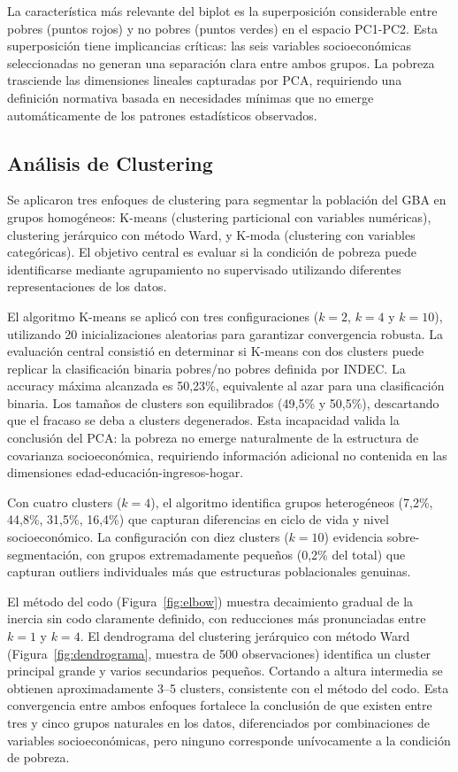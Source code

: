 \documentclass[11pt,a4paper]{article}
\begin{document}
La característica más relevante del biplot es la superposición considerable entre pobres (puntos rojos) y no pobres (puntos verdes) en el espacio PC1-PC2. Esta superposición tiene implicancias críticas: las seis variables socioeconómicas seleccionadas no generan una separación clara entre ambos grupos. La pobreza trasciende las dimensiones lineales capturadas por PCA, requiriendo una definición normativa basada en necesidades mínimas que no emerge automáticamente de los patrones estadísticos observados.

\subsection{Análisis de Clustering}

Se aplicaron tres enfoques de clustering para segmentar la población del GBA en grupos homogéneos: K-means (clustering particional con variables numéricas), clustering jerárquico con método Ward, y K-moda (clustering con variables categóricas). El objetivo central es evaluar si la condición de pobreza puede identificarse mediante agrupamiento no supervisado utilizando diferentes representaciones de los datos.

El algoritmo K-means se aplicó con tres configuraciones ($k=2$, $k=4$ y $k=10$), utilizando 20 inicializaciones aleatorias para garantizar convergencia robusta. La evaluación central consistió en determinar si K-means con dos clusters puede replicar la clasificación binaria pobres/no pobres definida por INDEC\@. La accuracy máxima alcanzada es 50,23\%, equivalente al azar para una clasificación binaria. Los tamaños de clusters son equilibrados (49,5\% y 50,5\%), descartando que el fracaso se deba a clusters degenerados. Esta incapacidad valida la conclusión del PCA: la pobreza no emerge naturalmente de la estructura de covarianza socioeconómica, requiriendo información adicional no contenida en las dimensiones edad-educación-ingresos-hogar.

Con cuatro clusters ($k=4$), el algoritmo identifica grupos heterogéneos (7,2\%, 44,8\%, 31,5\%, 16,4\%) que capturan diferencias en ciclo de vida y nivel socioeconómico. La configuración con diez clusters ($k=10$) evidencia sobre-segmentación, con grupos extremadamente pequeños (0,2\% del total) que capturan outliers individuales más que estructuras poblacionales genuinas.

El método del codo (Figura~\ref{fig:elbow}) muestra decaimiento gradual de la inercia sin codo claramente definido, con reducciones más pronunciadas entre $k=1$ y $k=4$. El dendrograma del clustering jerárquico con método Ward (Figura~\ref{fig:dendrograma}, muestra de 500 observaciones) identifica un cluster principal grande y varios secundarios pequeños. Cortando a altura intermedia se obtienen aproximadamente 3--5 clusters, consistente con el método del codo. Esta convergencia entre ambos enfoques fortalece la conclusión de que existen entre tres y cinco grupos naturales en los datos, diferenciados por combinaciones de variables socioeconómicas, pero ninguno corresponde unívocamente a la condición de pobreza.
\end{document}
